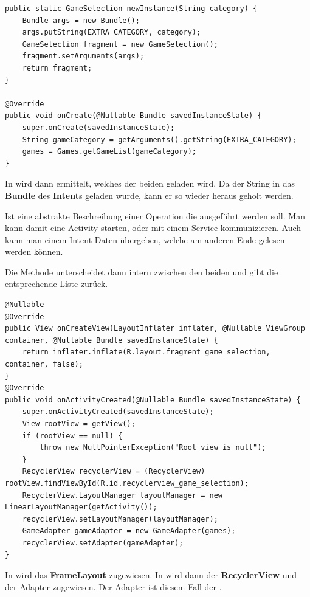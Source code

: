 \begin{lstlisting}[caption={Hub setupNavigationView() Methode},captionpos=b]
public static GameSelection newInstance(String category) {
	Bundle args = new Bundle();
	args.putString(EXTRA_CATEGORY, category);	
	GameSelection fragment = new GameSelection();
	fragment.setArguments(args);
	return fragment;
}

@Override
public void onCreate(@Nullable Bundle savedInstanceState) {
	super.onCreate(savedInstanceState);
	String gameCategory = getArguments().getString(EXTRA_CATEGORY);
	games = Games.getGameList(gameCategory);
}
\end{lstlisting}

In  wird dann ermittelt, welches der beiden geladen wird.
Da der String in das \textbf{Bundle} des \textbf{Intent}s geladen wurde, kann
er so wieder heraus geholt werden. 

\begin{infobox}[frametitle=Intent]
Ist eine abstrakte Beschreibung einer Operation die ausgeführt werden soll. Man
kann damit eine Activity starten, oder mit einem Service kommunizieren. Auch
kann man einem Intent Daten übergeben, welche am anderen Ende gelesen werden
können.
\end{infobox}

Die Methode 
unterscheidet dann intern zwischen den beiden und gibt die entsprechende Liste
zurück.\\

\begin{lstlisting}[caption={GameSelection onCreateView() \& onActivityCreated() Methode},
captionpos=b]
@Nullable
@Override
public View onCreateView(LayoutInflater inflater, @Nullable ViewGroup container, @Nullable Bundle savedInstanceState) {
	return inflater.inflate(R.layout.fragment_game_selection, container, false);
}
@Override
public void onActivityCreated(@Nullable Bundle savedInstanceState) {
	super.onActivityCreated(savedInstanceState);
	View rootView = getView();
	if (rootView == null) {
		throw new NullPointerException("Root view is null");
	}
	RecyclerView recyclerView = (RecyclerView) rootView.findViewById(R.id.recyclerview_game_selection);
	RecyclerView.LayoutManager layoutManager = new LinearLayoutManager(getActivity());
	recyclerView.setLayoutManager(layoutManager);
	GameAdapter gameAdapter = new GameAdapter(games);
	recyclerView.setAdapter(gameAdapter);
}
\end{lstlisting}

In  wird das \textbf{FrameLayout} zugewiesen. In
 wird dann der \textbf{RecyclerView} und der
Adapter zugewiesen. Der Adapter ist diesem Fall der .

